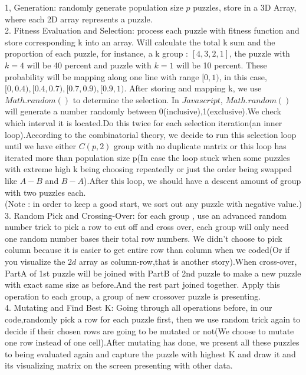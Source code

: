 \documentclass[12pt, letterpaper]{article}
\begin{document}
1, Generation: randomly generate population size $p$ puzzles, store in a 3D Array, where each 2D array represents a puzzle.\\

2. Fitness Evaluation and Selection: process each puzzle with fitness function and store corresponding k into an array. Will calculate the total k sum and the proportion of each puzzle, for instance, a k group : $[4,3,2,1]$, the puzzle with ${k=4}$ will be 40 percent and puzzle with $k=1$ will be 10 percent. These probability will be mapping along one line with range $[0,1)$, in this case,$[0,0.4),[0.4,0.7),[0.7,0.9),[0.9,1)$. After storing and mapping k, we use $Math.random()$ to determine the selection. In $Javascript$, $Math.random()$ will generate a number randomly between 0(inclusive),1(exclusive).We check which interval it is located.Do this twice for each selection iteration(an inner loop).According to the combinatorial theory, we decide to run this selection loop until we have either $C(p,2)$ group with no duplicate matrix or this loop has iterated more than population size p(In case the loop stuck when some puzzles with extreme high k being choosing repeatedly or just the order being swapped like $A-B$ and $B-A$).After this loop, we should have a descent amount of group with two puzzles each.\\

(Note : in order to keep a good start, we sort out any puzzle with negative value.)\\

3. Random Pick and Crossing-Over: for each group , use an advanced random number trick to pick a row to cut off and cross over, each group will only need one random number bases their total row numbers. We didn't choose to pick column because it is easier to get entire row than column when we coded(Or if you visualize the $2d$ array as column-row,that is another story).When cross-over, PartA of 1st puzzle will be joined with PartB of 2nd puzzle to make a new puzzle with exact same size as before.And the rest part joined together. Apply this operation to each group, a group of new crossover puzzle is presenting.\\

4. Mutating and Find Best K: Going through all operations before, in our code,randomly pick a row for each puzzle first, then we use random trick again to decide if their chosen rows are going to be mutated or not(We choose to mutate one row instead of one cell).After mutating has done, we present all these puzzles to being evaluated again and capture the puzzle with highest K and draw it and its visualizing matrix on the screen presenting with other data.\\
\end{document}
